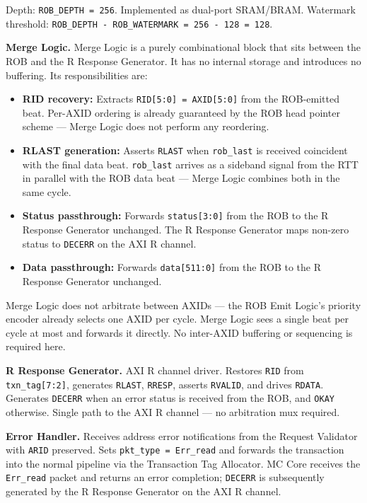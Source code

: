 Depth: \texttt{ROB\_DEPTH = 256}. Implemented as dual-port SRAM/BRAM. Watermark threshold: \texttt{ROB\_DEPTH - ROB\_WATERMARK = 256 - 128 = 128}.

\textbf{Merge Logic.}
Merge Logic is a purely combinational block that sits between the ROB and the R Response Generator. It has no internal storage and introduces no buffering. Its responsibilities are:
\begin{itemize}[noitemsep]
  \item \textbf{RID recovery:} Extracts \texttt{RID[5:0] = AXID[5:0]} from the ROB-emitted beat. Per-AXID ordering is already guaranteed by the ROB head pointer scheme — Merge Logic does not perform any reordering.
  \item \textbf{RLAST generation:} Asserts \texttt{RLAST} when \texttt{rob\_last} is received coincident with the final data beat. \texttt{rob\_last} arrives as a sideband signal from the RTT in parallel with the ROB data beat — Merge Logic combines both in the same cycle.
  \item \textbf{Status passthrough:} Forwards \texttt{status[3:0]} from the ROB to the R Response Generator unchanged. The R Response Generator maps non-zero status to \texttt{DECERR} on the AXI R channel.
  \item \textbf{Data passthrough:} Forwards \texttt{data[511:0]} from the ROB to the R Response Generator unchanged.
\end{itemize}
Merge Logic does not arbitrate between AXIDs — the ROB Emit Logic's priority encoder already selects one AXID per cycle. Merge Logic sees a single beat per cycle at most and forwards it directly. No inter-AXID buffering or sequencing is required here.

\textbf{R Response Generator.}
AXI R channel driver. Restores \texttt{RID} from \texttt{txn\_tag[7:2]}, generates \texttt{RLAST}, \texttt{RRESP}, asserts \texttt{RVALID}, and drives \texttt{RDATA}. Generates \texttt{DECERR} when an error status is received from the ROB, and \texttt{OKAY} otherwise. Single path to the AXI R channel — no arbitration mux required.

\textbf{Error Handler.}
Receives address error notifications from the Request Validator with \texttt{ARID} preserved. Sets \texttt{pkt\_type = Err\_read} and forwards the transaction into the normal pipeline via the Transaction Tag Allocator. MC Core receives the \texttt{Err\_read} packet and returns an error completion; \texttt{DECERR} is subsequently generated by the R Response Generator on the AXI R channel.

